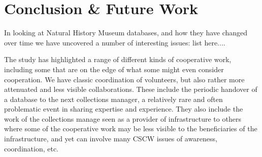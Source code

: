 \section{Conclusion & Future Work}
In looking at Natural History Museum databases, and how they have changed over time we have uncovered a number of interesting issues:
list here....

The study has highlighted a range of different kinds of cooperative work, including some that are on the edge of what some might even consider cooperation. We have classic coordination of volunteers, but also rather more attenuated and less visible collaborations. These include the periodic handover of a database to the next collections manager, a relatively rare and often problematic event in sharing expertise and experience. They also include the work of the collections manage seen as a provider of infrastructure to others where some of the cooperative work may be less visible to the beneficiaries of the infrastructure, and yet can involve many CSCW issues of awareness, coordination, etc.